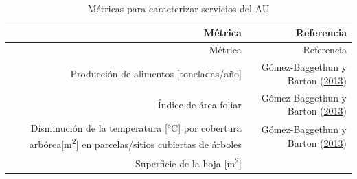\documentclass[12pt,a4paper,oneside, openany]{book}
\theoremstyle{definition}
\theoremstyle{definition}
\theoremstyle{definition}
\theoremstyle{remark}
\begin{document}
\begin{longtable}[]{@{}rr@{}}
\caption{\label{tab:ind-AU} Métricas para caracterizar servicios del
AU}\tabularnewline
\toprule
\begin{minipage}[b]{0.57\columnwidth}\raggedleft\strut
Métrica\strut
\end{minipage} & \begin{minipage}[b]{0.31\columnwidth}\raggedleft\strut
Referencia\strut
\end{minipage}\tabularnewline
\midrule
\endfirsthead
\toprule
\begin{minipage}[b]{0.57\columnwidth}\raggedleft\strut
Métrica\strut
\end{minipage} & \begin{minipage}[b]{0.31\columnwidth}\raggedleft\strut
Referencia\strut
\end{minipage}\tabularnewline
\midrule
\endhead
\begin{minipage}[t]{0.57\columnwidth}\raggedleft\strut
Producción de alimentos {[}toneladas/año{]}\strut
\end{minipage} & \begin{minipage}[t]{0.31\columnwidth}\raggedleft\strut
Gómez-Baggethun y Barton
(\protect\hyperlink{ref-gomez-baggethun_classifying_2013}{2013})\strut
\end{minipage}\tabularnewline
\begin{minipage}[t]{0.57\columnwidth}\raggedleft\strut
Índice de área foliar\strut
\end{minipage} & \begin{minipage}[t]{0.31\columnwidth}\raggedleft\strut
Gómez-Baggethun y Barton
(\protect\hyperlink{ref-gomez-baggethun_classifying_2013}{2013})\strut
\end{minipage}\tabularnewline
\begin{minipage}[t]{0.57\columnwidth}\raggedleft\strut
Disminución de la temperatura {[}°C{]} por cobertura
arbórea{[}m\textsuperscript{2}{]} en parcelas/sitios cubiertas de
árboles\strut
\end{minipage} & \begin{minipage}[t]{0.31\columnwidth}\raggedleft\strut
Gómez-Baggethun y Barton
(\protect\hyperlink{ref-gomez-baggethun_classifying_2013}{2013})\strut
\end{minipage}\tabularnewline
\begin{minipage}[t]{0.57\columnwidth}\raggedleft\strut
Superficie de la hoja {[}m\textsuperscript{2}{]}\strut
\end{minipage} & \begin{minipage}[t]{0.31\columnwidth}\raggedleft\strut

\end{minipage}
\end{longtable}
\end{document}
